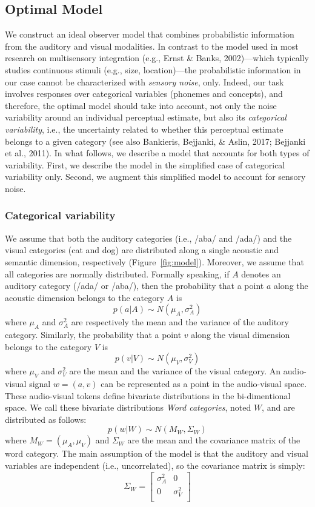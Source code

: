 \documentclass[english,floatsintext,man]{apa6}
\theoremstyle{definition}
\theoremstyle{definition}
\theoremstyle{definition}
\theoremstyle{remark}
\begin{document}
\subsection{Optimal Model}\label{optimal-model}

We construct an ideal observer model that combines probabilistic
information from the auditory and visual modalities. In contrast to the
model used in most research on multisensory integration (e.g., Ernst \&
Banks, 2002)---which typically studies continuous stimuli (e.g., size,
location)---the probabilistic information in our case cannot be
characterized with \emph{sensory noise}, only. Indeed, our task involves
responses over categorical variables (phonemes and concepts), and
therefore, the optimal model should take into account, not only the
noise variability around an individual perceptual estimate, but also its
\emph{categorical variability}, i.e., the uncertainty related to whether
this perceptual estimate belongs to a given category (see also
Bankieris, Bejjanki, \& Aslin, 2017; Bejjanki et al., 2011). In what
follows, we describe a model that accounts for both types of
variability. First, we describe the model in the simplified case of
categorical variability only. Second, we augment this simplified model
to account for sensory noise.

\subsubsection{Categorical variability}\label{categorical-variability}

We assume that both the auditory categories (i.e., /aba/ and /ada/) and
the visual categories (cat and dog) are distributed along a single
acoustic and semantic dimension, respectively (Figure~\ref{fig:model}).
Moreover, we assume that all categories are normally distributed.
Formally speaking, if \(A\) denotes an auditory category (/ada/ or
/aba/), then the probability that a point \(a\) along the acoustic
dimension belongs to the category \(A\) is
\[ p(a | A) \sim  N(\mu_A, \sigma^2_A) \] where \(\mu_A\) and
\(\sigma^2_A\) are respectively the mean and the variance of the
auditory category. Similarly, the probability that a point \(v\) along
the visual dimension belongs to the category \(V\) is
\[ p(v | V) \sim  N(\mu_V, \sigma^2_V) \] where \(\mu_V\) and
\(\sigma^2_V\) are the mean and the variance of the visual category. An
audio-visual signal \(w=(a,v)\) can be represented as a point in the
audio-visual space. These audio-visual tokens define bivariate
distributions in the bi-dimentional space. We call these bivariate
distributions \emph{Word categories}, noted \(W\), and are distributed
as follows: \[ p(w | W) \sim  N(M_W, \Sigma_W) \] where
\(M_W=(\mu_A, \mu_V)\) and \(\Sigma_W\) are the mean and the covariance
matrix of the word category. The main assumption of the model is that
the auditory and visual variables are independent (i.e., uncorrelated),
so the covariance matrix is simply: \[
   \Sigma_W=
  \left[ {\begin{array}{cc}
   \sigma^2_A & 0 \\
   0 & \sigma^2_V \\
  \end{array} } \right]
\]
\end{document}
